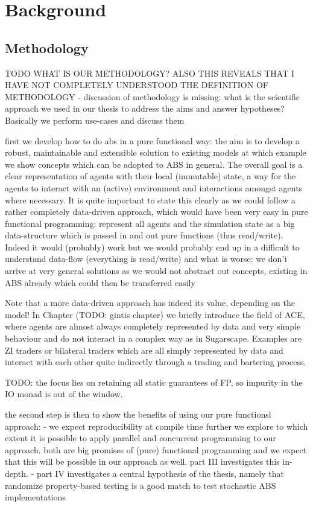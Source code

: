 \chapter{Background}
\label{ch:background}







\section{Methodology}
TODO WHAT IS OUR METHODOLOGY? ALSO THIS REVEALS THAT I HAVE NOT COMPLETELY UNDERSTOOD THE DEFINITION OF METHODOLOGY
- discussion of methodology is missing: what is the scientific approach we used in our thesis to address the aims and answer hypotheses? Basically we perform use-cases and discuss them

first we develop how to do abs in a pure functional way: the aim is to develop a robust, maintainable and extensible solution to existing models at which example we show concepts which can be adopted to ABS in general. The overall goal is a clear representation of agents with their local (immutable) state, a way for the agents to interact with an (active) environment and interactions amongst agents where necessary. It is quite important to state this clearly as we could follow a rather completely data-driven approach, which would have been very easy in pure functional programming: represent all agents and the simulation state as a big data-structure which is passed in and out pure functions (thus read/write). Indeed it would (probably) work but we would probably end up in a difficult to understand data-flow (everything is read/write) and what is worse: we don't arrive at very general solutions as we would not abstract out concepts, existing in ABS already which could then be transferred easily

Note that a more data-driven approach has indeed its value, depending on the model! In Chapter (TODO: gintis chapter) we briefly introduce the field of ACE, where agents are almost always completely represented by data and very simple behaviour and do not interact in a complex way as in Sugarscape. Examples are ZI traders or bilateral traders which are all simply represented by data and interact with each other quite indirectly through a trading and bartering process.

TODO: the focus lies on retaining all static guarantees of FP, so impurity in the IO monad is out of the window. 

the second step is then to show the benefits of using our pure functionsl approach:
- we expect reproducibility at compile time
further we explore to which extent it is possible to apply parallel and concurrent programming to our approach. both are big promises of (pure) functional programming and we expect that this will be possible in our approach as well. part III investigates this in-depth.
- part IV investigates a central hypothesis of the thesis, namely that randomize property-based testing is a good match to test stochastic ABS implementations 